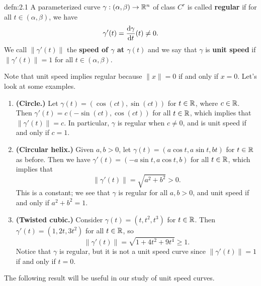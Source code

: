 \begin{defn}{defn:2.1}
    A parameterized curve $\gamma : (\alpha, \beta) \to \mathbb{R}^n$ of class $C^r$ is called 
    {\bf regular} if for all $t \in (\alpha, \beta)$, we have 
    \[ \gamma'(t) = \frac{{\rm d}\gamma}{{\rm d}t}(t) \neq 0. \] 
    We call $\|\gamma'(t)\|$ the {\bf speed of $\gamma$ 
    at $\gamma(t)$} and we say that $\gamma$ is {\bf unit speed} if $\|\gamma'(t)\| = 1$ for all 
    $t \in (\alpha, \beta)$. 
\end{defn}\vspace{-0.25cm}
Note that unit speed implies regular because $\|x\| = 0$ if and only if $x = 0$. 
Let's look at some examples. 
\begin{enumerate}[(1)]
    \item {\bf (Circle.)} Let $\gamma(t) = (\cos(ct), \sin(ct))$ for $t \in \mathbb{R}$, 
    where $c \in \mathbb{R}$. Then $\gamma'(t) = c(-\sin(ct), \cos(ct))$ for all $t \in \mathbb{R}$,
    which implies that $\|\gamma'(t)\| = c$. In particular, $\gamma$ is 
    regular when $c \neq 0$, and is unit speed if and only if $c = 1$. 
    
    \item {\bf (Circular helix.)} Given $a, b > 0$, let $\gamma(t) = 
    (a\cos t, a\sin t, bt)$ for $t \in \mathbb{R}$ as before. Then we have $\gamma'(t) = 
    (-a\sin t, a\cos t, b)$ for all $t \in \mathbb{R}$, which implies that 
    \[ \|\gamma'(t)\| = \sqrt{a^2 + b^2} > 0. \] 
    This is a constant; we see that $\gamma$ is regular for all $a, b > 0$, 
    and unit speed if and only if $a^2 + b^2 = 1$. 

    \item {\bf (Twisted cubic.)} Consider $\gamma(t) = (t, t^2, t^3)$ for $t \in \mathbb{R}$. 
    Then $\gamma'(t) = (1, 2t, 3t^2)$ for all $t \in \mathbb{R}$, so 
    \[ \|\gamma'(t)\| = \sqrt{1 + 4t^2 + 9t^4} \geq 1. \] 
    Notice that $\gamma$ is regular, but it is not 
    a unit speed curve since $\|\gamma'(t)\| = 1$ if and only if $t = 0$. 
\end{enumerate}
The following result will be useful in our study of unit speed curves. 

